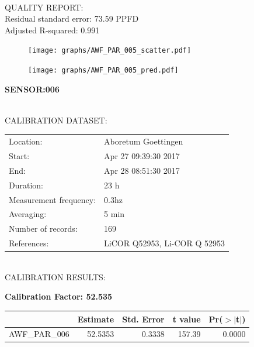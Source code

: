 \documentclass[oneside]{report}
\begin{document}
\hrulefill\\
QUALITY REPORT:\\
Residual standard error: 73.59 PPFD\\
Adjusted R-squared: 0.991



\begin{figure}[H]
  \centering
  \texttt{[image: graphs/AWF\_PAR\_005\_scatter.pdf]}
\end{figure}




\begin{figure}[H]
  \centering
  \texttt{[image: graphs/AWF\_PAR\_005\_pred.pdf]}
\end{figure}

\pagebreak


\begin{center}
\large{\textbf{SENSOR:006}}\\
\end{center}

\hrulefill\\
CALIBRATION DATASET:\\
\begin{table}[h!]
  \centering
  \label{tab:table1}
  \begin{tabular}{ll}
    Location: & Aboretum Goettingen\\ 
    
    
    Start:  & Apr 27 09:39:30 2017 \\
    End:   & Apr 28 08:51:30 2017\\ 
    Duration: & 23 h\\
    Measurement frequency: & 0.3hz\\
    Averaging:  &5 min\\
    Number of records: & 169 \\
    References: & LiCOR Q52953, Li-COR Q 52953 \\
  \end{tabular}
\end{table}

\hrulefill\\
CALIBRATION RESULTS:\\


\begin{center}
\textbf{\large{Calibration Factor: 52.535}}\\
\end{center}
\begin{table}[ht]
\centering
\begin{tabular}{rrrrr}
  \hline
 & Estimate & Std. Error & t value & Pr($>$$|$t$|$) \\ 
  \hline
AWF\_PAR\_006 & 52.5353 & 0.3338 & 157.39 & 0.0000 \\ 
   \hline
\end{tabular}
\end{table}
\end{document}

